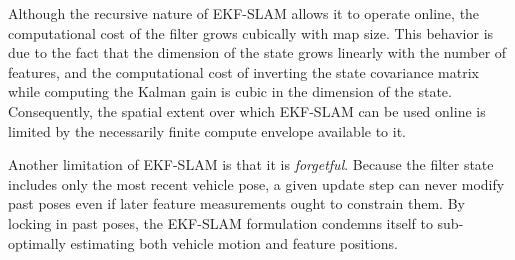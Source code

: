 \documentclass[letterpaper, 10 pt, conference]{ieeeconf}  %
\begin{document}
Although the recursive nature of EKF-SLAM allows it to operate online, the computational cost of the filter grows cubically with map size.
This behavior is due to the fact that the dimension of the state grows linearly with the number of features, and the computational cost of inverting the state covariance matrix while computing the Kalman gain is cubic in the dimension of the state.
Consequently, the spatial extent over which EKF-SLAM can be used online is limited by the necessarily finite compute envelope available to it.

Another limitation of EKF-SLAM is that it is \textit{forgetful}.
Because the filter state includes only the most recent vehicle pose, a given update step can never modify past poses even if later feature measurements ought to constrain them.
By locking in past poses, the EKF-SLAM formulation condemns itself to sub-optimally estimating both vehicle motion and feature positions.

\end{document}

